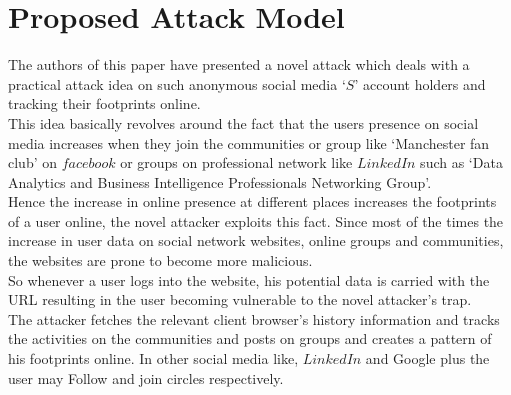 \documentclass{article}
\begin{document}
\section*{Proposed Attack Model}
The authors of this paper have presented a novel attack which deals with a practical attack idea on such anonymous social media `$S$' account holders and tracking their footprints online.\\
This idea basically revolves around the fact that the users presence on social media increases when they join the communities or group like `Manchester fan club' on $facebook$ or groups on professional network like $LinkedIn$ such as `Data Analytics and Business Intelligence Professionals Networking Group'.\\
Hence the increase in online presence at different places increases the footprints of a user online, the novel attacker exploits this fact. Since most of the times the increase in user data on social network websites, online groups and communities, the websites are prone to become more malicious.\\
So whenever a user logs into the website, his potential data is carried with the URL resulting in the user becoming vulnerable to the novel attacker's trap.\\
The attacker fetches the relevant client browser's history information and tracks the activities on the communities and posts on groups and creates a pattern of his footprints online. In other social media like, $LinkedIn$ and Google plus the user may Follow and join circles respectively.\\
\end{document}
